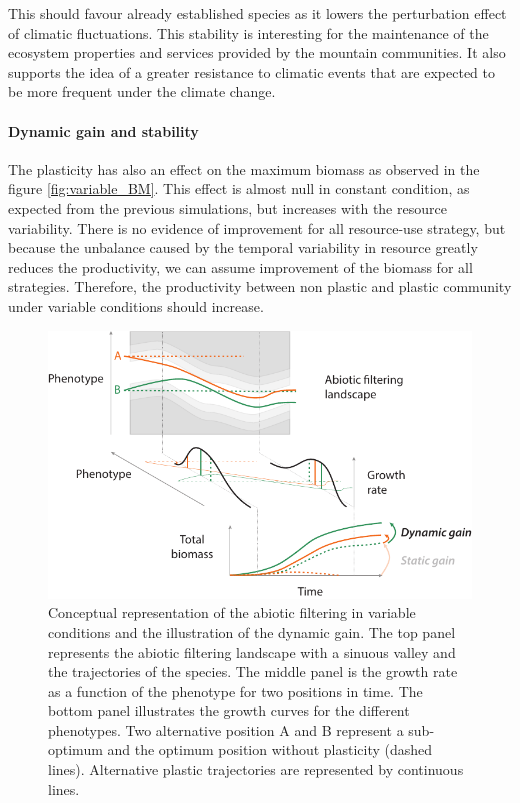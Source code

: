 This  should favour already established species as it lowers the perturbation effect of climatic fluctuations. This stability is interesting for the maintenance of the ecosystem properties and services provided by the mountain communities. It also supports the idea of a greater resistance to climatic events that are expected to be more frequent under the climate change. 


\paragraph{Dynamic gain and stability}

The plasticity has also an effect on the maximum biomass as observed in the figure \ref{fig:variable_BM}. This effect is almost null in constant condition, as expected from the previous simulations, but increases with the resource variability. There is no evidence of improvement for all resource-use strategy, but because the unbalance caused by the temporal variability in resource greatly reduces the productivity, we can assume improvement of the biomass for all strategies. Therefore, the productivity between non plastic and plastic community under variable conditions should increase.

\begin{figure}\label{fig:variable_filter}
\includegraphics[width = \textwidth]{./2_PP/Figures/Variable/variable_filter.pdf}
\caption[Abiotic filtering in temporally variable conditions]{Conceptual representation of the abiotic filtering in variable conditions and the illustration of the dynamic gain. The top panel represents the abiotic filtering landscape with a sinuous valley and the trajectories of the species. The middle panel is the growth rate as a function of the phenotype for two positions in time. The bottom panel illustrates the growth curves for the different phenotypes. Two alternative position \textcolor{myOrange}{A} and \textcolor{myGreen}{B} represent a sub-optimum and the optimum position without plasticity (dashed lines). Alternative plastic trajectories are represented by continuous lines.}
\end{figure}

